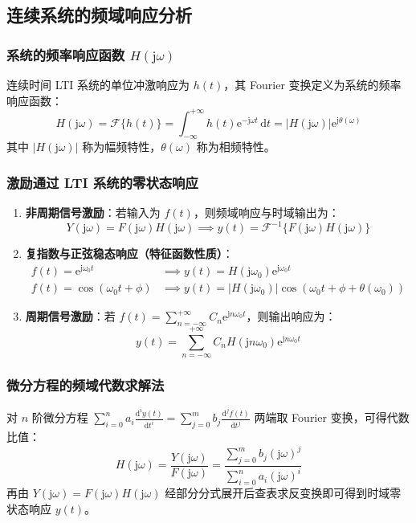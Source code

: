 \documentclass[11pt,a4paper,fontset=fandol]{ctexart}
\theoremstyle{remark}
\begin{document}
\subsection{连续系统的频域响应分析}

\subsubsection{系统的频率响应函数 $H(\mathrm{j}\omega)$}
连续时间 LTI 系统的单位冲激响应为 $h(t)$，其 Fourier 变换定义为系统的频率响应函数：
\begin{equation}
    H(\mathrm{j}\omega) = \mathcal{F}\{h(t)\} = \int_{-\infty}^{+\infty} h(t)\mathrm{e}^{-\mathrm{j}\omega t}\,\mathrm{d}t = |H(\mathrm{j}\omega)|\mathrm{e}^{\mathrm{j}\theta(\omega)}
\end{equation}
其中 $|H(\mathrm{j}\omega)|$ 称为幅频特性，$\theta(\omega)$ 称为相频特性。

\subsubsection{激励通过 LTI 系统的零状态响应}
\begin{enumerate}
    \item \textbf{非周期信号激励}：若输入为 $f(t)$，则频域响应与时域输出为：
    \begin{equation}
        Y(\mathrm{j}\omega) = F(\mathrm{j}\omega) H(\mathrm{j}\omega) \implies y(t) = \mathcal{F}^{-1}\{F(\mathrm{j}\omega) H(\mathrm{j}\omega)\}
    \end{equation}
    \item \textbf{复指数与正弦稳态响应（特征函数性质）}：
    \begin{align}
        f(t) = \mathrm{e}^{\mathrm{j}\omega_0 t} &\implies y(t) = H(\mathrm{j}\omega_0)\mathrm{e}^{\mathrm{j}\omega_0 t} \\
        f(t) = \cos(\omega_0 t + \phi) &\implies y(t) = |H(\mathrm{j}\omega_0)|\cos(\omega_0 t + \phi + \theta(\omega_0))
    \end{align}
    \item \textbf{周期信号激励}：若 $f(t) = \sum_{n=-\infty}^{+\infty} C_n \mathrm{e}^{\mathrm{j}n\omega_0 t}$，则输出响应为：
    \begin{equation}
        y(t) = \sum_{n=-\infty}^{+\infty} C_n H(\mathrm{j}n\omega_0)\mathrm{e}^{\mathrm{j}n\omega_0 t}
    \end{equation}
\end{enumerate}

\subsubsection{微分方程的频域代数求解法}
对 $n$ 阶微分方程 $\sum_{i=0}^n a_i \frac{\mathrm{d}^i y(t)}{\mathrm{d}t^i} = \sum_{j=0}^m b_j \frac{\mathrm{d}^j f(t)}{\mathrm{d}t^j}$ 两端取 Fourier 变换，可得代数比值：
\begin{equation}
    H(\mathrm{j}\omega) = \frac{Y(\mathrm{j}\omega)}{F(\mathrm{j}\omega)} = \frac{\sum_{j=0}^m b_j (\mathrm{j}\omega)^j}{\sum_{i=0}^n a_i (\mathrm{j}\omega)^i}
\end{equation}
再由 $Y(\mathrm{j}\omega) = F(\mathrm{j}\omega)H(\mathrm{j}\omega)$ 经部分分式展开后查表求反变换即可得到时域零状态响应 $y(t)$。
\end{document}
